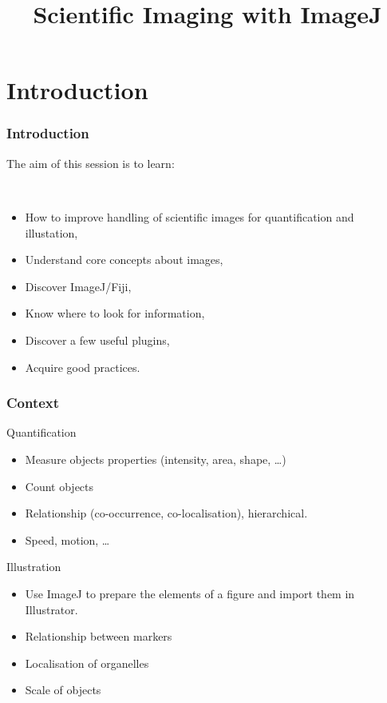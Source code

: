 \documentclass[ignorenonframetext,aspectratio=169,10pt,xcolor=table]{beamer}
\title{Scientific Imaging with ImageJ}
\begin{document}
\begin{frame}
  \maketitle
\end{frame}

\section{Introduction}

\begin{frame} \frametitle<presentation>{Introduction}
  The aim of this session is to learn:

  ~~

  \begin{itemize}   \setlength\itemsep{1em}
    \item How to improve handling of scientific images for quantification and
      illustation,
    \item Understand core concepts about images,
    \item Discover ImageJ/Fiji,
    \item Know where to look for information,
    \item Discover a few useful plugins,
    \item Acquire good practices.
  \end{itemize}
\end{frame}


\begin{frame} \frametitle{Context}
  \begin{block}{Quantification}
    \begin{itemize}
    \item Measure objects properties (intensity, area, shape, \dots)
    \item Count objects
    \item Relationship (co-occurrence, co-localisation), hierarchical.
    \item Speed, motion, \dots
    \end{itemize}
  \end{block}
  \begin{block}{Illustration}

    \begin{itemize}
    \item Use ImageJ to prepare the elements of a figure and import
      them in Illustrator.
    \item Relationship between markers
    \item Localisation of organelles
    \item Scale of objects
    \end{itemize}
  \end{block}
\end{frame}
\end{document}
